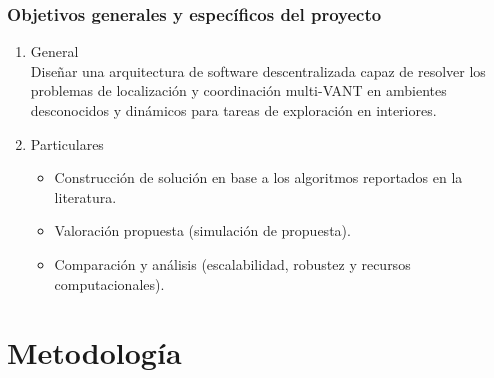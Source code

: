 \documentclass[
	11pt, %
	aspectratio=169, %
]{beamer}
\begin{document}
\begin{frame}
  
  \frametitle{Objetivos generales y específicos del proyecto}

  \begin{enumerate}
  \item<1-> General \\

    Diseñar una arquitectura de software descentralizada capaz de resolver los problemas de localización y coordinación multi-VANT en ambientes desconocidos y dinámicos para tareas de exploración en interiores.
        
  \item<2-> Particulares\\

    \begin{itemize}
    \item<1-> Construcción de solución en base a los algoritmos reportados en la literatura.
    \item<2-> Valoración propuesta (simulación de propuesta).
    \item<3-> Comparación y análisis (escalabilidad, robustez y recursos computacionales).
    \end{itemize}
    
  \end{enumerate}
\end{frame}

\section{Metodología}
\end{document}
